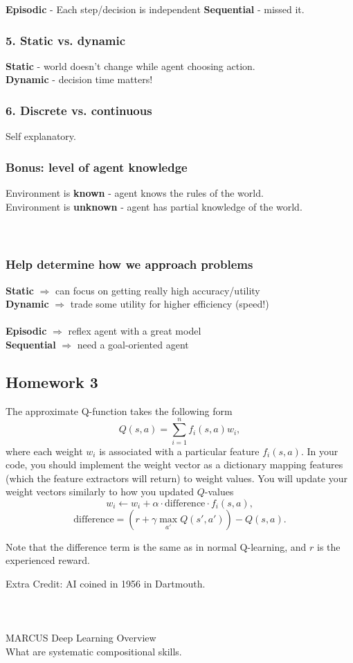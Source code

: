 \documentclass[10pt]{article}
\theoremstyle{plain}
\begin{document}
\textbf{Episodic} - Each step/decision is independent
\textbf{Sequential} - missed it. 

\subsubsection*{5. Static vs. dynamic}

\textbf{Static} - world doesn't change while agent choosing action. \\
\textbf{Dynamic} - decision time matters!

\subsubsection*{6. Discrete vs. continuous}

Self explanatory. 

\subsubsection*{Bonus: level of agent knowledge}

Environment is \textbf{known} - agent knows the rules of the world. \\
Environment is \textbf{unknown} - agent has partial knowledge of the world. \\\\\

\subsubsection*{Help determine how we approach problems}

\textbf{Static} $\Rightarrow$ can focus on getting really high accuracy/utility\\
\textbf{Dynamic} $\Rightarrow$ trade some utility for higher efficiency (speed!)\\\\
\textbf{Episodic} $\Rightarrow$ reflex agent with a great model\\
\textbf{Sequential} $\Rightarrow$ need a goal-oriented agent\\

\subsection*{Homework 3}

The approximate Q-function takes the following form
\[Q(s,a) = \sum\limits_{i=1}^n f_i(s,a) w_i, \]
where each weight $w_i$ is associated with a particular feature $f_i(s,a)$. In your code, you should implement the weight vector as a dictionary mapping features (which the feature extractors will return) to weight values. You will update your weight vectors similarly to how you updated $Q$-values
\[w_i \leftarrow w_i + \alpha \cdot \text{difference} \cdot f_i(s,a), \]
\[ \text{difference} = (r + \gamma \max\limits_{a'} Q(s', a')) - Q(s,a). \]


Note that the difference term is the same as in normal Q-learning, and \( r \) is the experienced reward.

Extra Credit: AI coined in 1956 in Dartmouth. \\\\\\\\

MARCUS Deep Learning Overview\\
What are systematic compositional skills. 
\end{document}
